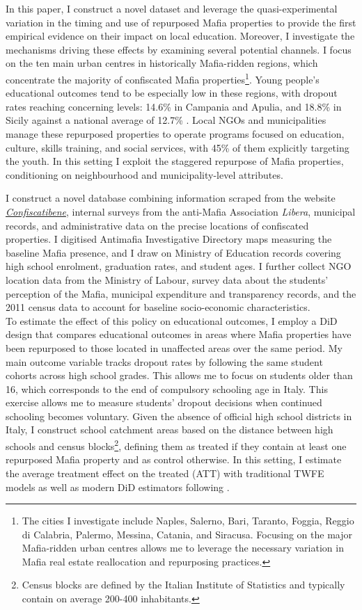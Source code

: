 \documentclass[12pt]{article}
\theoremstyle{plain}
\theoremstyle{plain}
\theoremstyle{plain}
\theoremstyle{definition}
\theoremstyle{plain}
\theoremstyle{definition}
\theoremstyle{plain}
\theoremstyle{remark}
\theoremstyle{definition}
\theoremstyle{definition}
\theoremstyle{plain}
\begin{document}
In this paper, I construct a novel dataset and leverage the quasi-experimental variation in the timing and use of repurposed Mafia properties to provide the first empirical evidence on their impact on local education. Moreover, I investigate the mechanisms driving these effects by examining several potential channels. I focus on the ten main urban centres in historically Mafia-ridden regions, which concentrate the majority of confiscated Mafia properties\footnote{The cities I investigate include Naples, Salerno, Bari, Taranto, Foggia, Reggio di Calabria, Palermo, Messina, Catania, and Siracusa. Focusing on the major Mafia-ridden urban centres allows me to leverage the necessary variation in Mafia real estate reallocation and repurposing practices.}. Young people's educational outcomes tend to be especially low in these regions, with dropout rates reaching concerning levels: 14.6\% in Campania and Apulia, and 18.8\% in Sicily against a national average of 12.7\% \citep{save_the_children_alla_2022}. Local NGOs and municipalities manage these repurposed properties to operate programs focused on education, culture, skills training, and social services, with 45\% of them explicitly targeting the youth. In this setting I exploit the staggered repurpose of Mafia properties, conditioning on neighbourhood and municipality-level attributes. \par
\medskip
I construct a novel database combining information scraped from the website \emph{\href{https://www.confiscatibene.it/}{Confiscatibene}}, internal surveys from the anti-Mafia Association \emph{Libera}, municipal records, and administrative data on the precise locations of confiscated properties. I digitised Antimafia Investigative Directory maps measuring the baseline Mafia presence, and I draw on Ministry of Education records covering high school enrolment, graduation rates, and student ages. I further collect NGO location data from the Ministry of Labour, survey data about the students' perception of the Mafia, municipal expenditure and transparency records, and the 2011 census data to account for baseline socio-economic characteristics. \\
To estimate the effect of this policy on educational outcomes, I employ a DiD design that compares educational outcomes in areas where Mafia properties have been repurposed to those located in unaffected areas over the same period. My main outcome variable tracks dropout rates by following the same student cohorts across high school grades. This allows me to focus on students older than 16, which corresponds to the end of compulsory schooling age in Italy. This exercise allows me to measure students' dropout decisions when continued schooling becomes voluntary. Given the absence of official high school districts in Italy, I construct school catchment areas based on the distance between high schools and census blocks\footnote{Census blocks are defined by the Italian Institute of Statistics and typically contain on average 200-400 inhabitants.}, defining them as treated if they contain at least one repurposed Mafia property and as control otherwise. In this setting, I estimate the average treatment effect on the treated (ATT) with traditional TWFE models as well as modern DiD estimators following \citet{sun_estimating_2021}. \par
\end{document}
